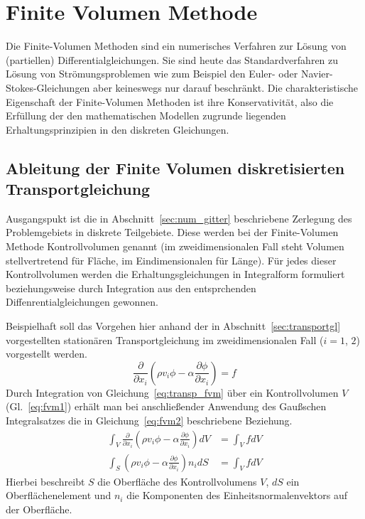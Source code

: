 \section{Finite Volumen Methode}

Die Finite-Volumen Methoden sind ein numerisches Verfahren zur Lösung von (partiellen)
Differentialgleichungen. Sie sind heute das Standardverfahren zu Lösung von Strömungsproblemen
wie zum Beispiel den Euler- oder Navier-Stokes-Gleichungen aber keineswegs nur darauf beschränkt.
Die charakteristische Eigenschaft der Finite-Volumen Methoden ist ihre Konservativität, also
die Erfüllung der den mathematischen Modellen zugrunde liegenden Erhaltungsprinzipien in den
diskreten Gleichungen.

\subsection{Ableitung der Finite Volumen diskretisierten Transportgleichung}

Ausgangspukt ist die in Abschnitt~\ref{sec:num_gitter} beschriebene Zerlegung des Problemgebiets
in diskrete Teilgebiete. Diese werden bei der Finite-Volumen Methode Kontrollvolumen
genannt (im zweidimensionalen Fall steht Volumen stellvertretend für Fläche,
im Eindimensionalen für Länge).
Für jedes dieser Kontrollvolumen werden die Erhaltungsgleichungen in Integralform formuliert
beziehungsweise durch Integration aus den entsprchenden Diffenrentialgleichungen gewonnen.

Beispielhaft soll das Vorgehen hier anhand der in Abschnitt~\ref{sec:transportgl}
vorgestellten stationären Transportgleichung im zweidimensionalen Fall
($i=1$, $2$) vorgestellt werden.
\begin{equation}
  \frac{\partial}{\partial x_i} \left({\rho v_i \phi
- \alpha \frac{\partial \phi}{\partial x_i} }\right) = f
\label{eq:transp_fvm}
\end{equation}
Durch Integration von Gleichung~\eqref{eq:transp_fvm} über ein Kontrollvolumen $V$ (Gl.~\ref{eq:fvm1})
erhält man bei anschließender Anwendung des Gaußschen Integralsatzes die in Gleichung~\eqref{eq:fvm2} beschriebene Beziehung.
\begin{align}
  \int_V \frac{\partial}{\partial x_i} \left({\rho v_i \phi
- \alpha \frac{\partial \phi}{\partial x_i} }\right) dV &= \int_V f dV \label{eq:fvm1}\\
  \int_S  \left({\rho v_i \phi
- \alpha \frac{\partial \phi}{\partial x_i} }\right) n_i dS&= \int_V f dV \label{eq:fvm2}
\end{align}
Hierbei beschreibt $S$ die Oberfläche des Kontrollvolumens $V$, $dS$ ein Oberflächenelement
und $n_i$ die Komponenten des Einheitsnormalenvektors auf der Oberfläche.

